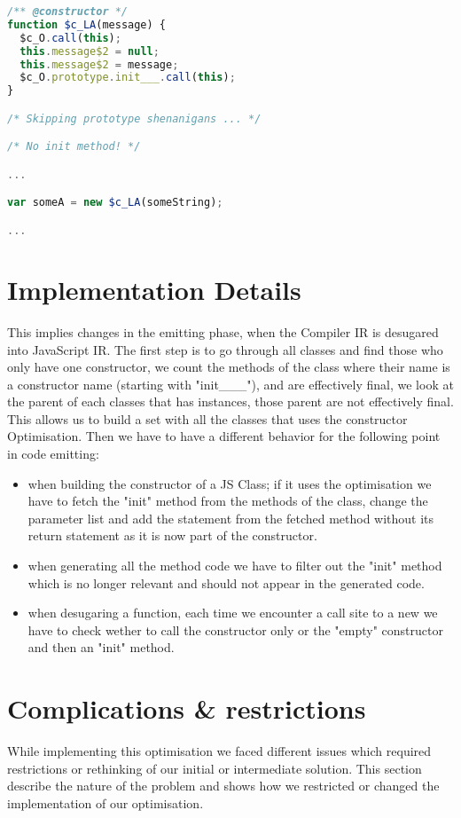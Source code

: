 \begin{lstlisting}[language=javascript,caption=Generated JavaScript with constructor optimisation., label={lst:ctorOptJS}]
/** @constructor */
function $c_LA(message) {
  $c_O.call(this);
  this.message$2 = null;
  this.message$2 = message;
  $c_O.prototype.init___.call(this);
}

/* Skipping prototype shenanigans ... */

/* No init method! */

...

var someA = new $c_LA(someString);

...

\end{lstlisting}

\section{Implementation Details}
This implies changes in the emitting phase, when the Compiler IR is desugared into JavaScript IR. The first step is to go through all classes and find those who only have one constructor, we count the methods of the class where their name is a constructor name (starting with "init\_\_\_"), and are effectively final, we look at the parent of each classes that has instances, those parent are not effectively final. This allows us to build a set with all the classes that uses the constructor Optimisation. Then we have to have a different behavior for the following point in code emitting:
\begin{itemize}
    \item when building the constructor of a JS Class; if it uses the optimisation we have to fetch the "init" method from the methods of the class, change the parameter list and add the statement from the fetched method without its return statement as it is now part of the constructor.
    \item when generating all the method code we have to filter out the "init" method which is no longer relevant and should not appear in the generated code.
    \item when desugaring a function, each time we encounter a call site to a new we have to check wether to call the constructor only or the "empty" constructor and then an "init" method.
\end{itemize}

\section{Complications \& restrictions}
While implementing this optimisation we faced different issues which required restrictions or rethinking of our initial or intermediate solution. This section describe the nature of the problem and shows how we restricted or changed the implementation of our optimisation.
